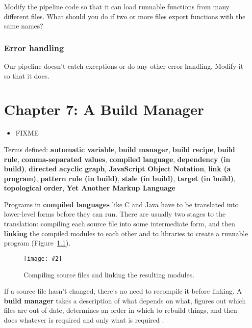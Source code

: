 \documentclass{scrbook}
\newcommand{\figref}[1]{Figure~\ref{#1}}
\newcommand{\figpdf}[4]{\begin{figure}%
\centering%
\texttt{[image: \#2]}%
\caption{#3}%
\label{#1}%
\end{figure}}
\newcommand{\glossref}[1]{\textbf{#1}}
\begin{document}
Modify the pipeline code so that it can load runnable functions from many different files.
What should you do if two or more files export functions with the same names?

\subsection*{Error handling}


Our pipeline doesn't catch exceptions or do any other error handling.
Modify it so that it does.

\chapter{Chapter 7: A Build Manager}\label{builder}

\begin{itemize}

\item FIXME

\end{itemize}


\noindent 
    Terms defined:
    \glossref{automatic variable}, \glossref{build manager}, \glossref{build recipe}, \glossref{build rule}, \glossref{comma-separated values}, \glossref{compiled language}, \glossref{dependency (in build)}, \glossref{directed acyclic graph}, \glossref{JavaScript Object Notation}, \glossref{link (a program)}, \glossref{pattern rule (in build)}, \glossref{stale (in build)}, \glossref{target (in build)}, \glossref{topological order}, \glossref{Yet Another Markup Language}



Programs in \glossref{compiled languages}
like C and Java
have to be translated into lower-level forms before they can run.
There are usually two stages to the translation:
compiling each source file into some intermediate form,
and then \glossref{linking} the compiled modules
to each other and to libraries
to create a runnable program
(\figref{builder-compiling}).

\figpdf{builder-compiling}{./builder/compiling.pdf}{Compiling source files and linking the resulting modules.}{0.6}


If a source file hasn't changed,
there's no need to recompile it before linking.
A \glossref{build manager} takes a description of what depends on what,
figures out which files are out of date,
determines an order in which to rebuild things,
and then does whatever is required and only what is required \cite{Smith2011}.
\end{document}
